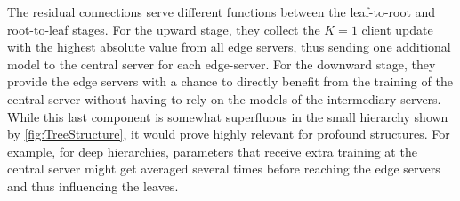 The residual connections serve different functions between the leaf-to-root and root-to-leaf stages. For the upward stage, they collect the $K=1$ client update with the highest absolute value from all edge servers, thus sending one additional model to the central server for each edge-server. For the downward stage, they provide the edge servers with a chance to directly benefit from the training of the central server without having to rely on the models of the intermediary servers. While this last component is somewhat superfluous in the small hierarchy shown by \cref{fig:TreeStructure}, it would prove highly relevant for profound structures. For example, for deep hierarchies, parameters that receive extra training at the central server might get averaged several times before reaching the edge servers and thus influencing the leaves.



